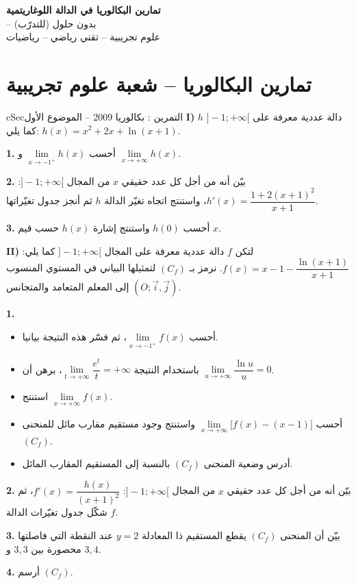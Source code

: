 \documentclass[12pt,a4paper]{article}
\newenvironment{BOX}[2]{\begin{otherlanguage}{english}\begin{arbox}{#1}{#2}}{\end{arbox}\end{otherlanguage}}
\newcounter{exo}
\newenvironment{tamrin}[1]{\stepcounter{exo}\begin{BOX}{cSec}{التمرين \theexo: #1}}{\end{BOX}}
\newenvironment{LTR}{\begin{otherlanguage}{english}}{\end{otherlanguage}}
\newenvironment{sq}{\begin{itemize}[leftmargin=2.4em,itemsep=3pt]}{\end{itemize}}
\newcommand{\qa}{\item[(أ)]}\newcommand{\qb}{\item[(ب)]}\newcommand{\qc}{\item[(جـ)]}\newcommand{\qd}{\item[(د)]}\newcommand{\qe}{\item[(هـ)]}
\newcommand{\QQ}[1]{\par\smallskip\textbf{#1.} }
\begin{document}
\begin{LTR}
\begin{tcolorbox}[enhanced,colback=cSec,colframe=cSec,arc=3mm,halign=center,boxrule=0pt,top=12pt,bottom=12pt,before upper={\selectlanguage{arabic}}]
{\color{white}\fontsize{26}{32}\selectfont\bfseries تمارين البكالوريا في الدالة اللوغاريتمية}\\[8pt]
{\color{white}\large -- بدون حلول (للتدرّب)}\\[5pt]
{\color{white}\large علوم تجريبية -- تقني رياضي -- رياضيات}
\end{tcolorbox}
\end{LTR}

\section{تمارين البكالوريا -- شعبة علوم تجريبية}

\begin{tamrin}{بكالوريا 2009 -- الموضوع الأول}
\textbf{I)} $h$ دالة عددية معرفة على $]-1;+\infty[$ كما يلي: $h(x)=x^2+2x+\ln(x+1)$.
\QQ{1} أحسب $\lim\limits_{x\to -1^{+}}h(x)$ و $\lim\limits_{x\to +\infty}h(x)$.
\QQ{2} بيّن أنه من أجل كل عدد حقيقي $x$ من المجال $]-1;+\infty[$: $h'(x)=\dfrac{1+2(x+1)^2}{x+1}$، واستنتج اتجاه تغيّر الدالة $h$ ثم أنجز جدول تغيّراتها.
\QQ{3} أحسب $h(0)$ واستنتج إشارة $h(x)$ حسب قيم $x$.

\textbf{II)} لتكن $f$ دالة عددية معرفة على المجال $]-1;+\infty[$ كما يلي: $f(x)=x-1-\dfrac{\ln(x+1)}{x+1}$.
نرمز بـ $(C_f)$ لتمثيلها البياني في المستوي المنسوب إلى المعلم المتعامد والمتجانس $(O;\vec i,\vec j)$.
\QQ{1}
\begin{sq}
\qa أحسب $\lim\limits_{x\to -1^{+}}f(x)$، ثم فسّر هذه النتيجة بيانيا.
\qb باستخدام النتيجة $\lim\limits_{t\to +\infty}\dfrac{e^{t}}{t}=+\infty$، برهن أن $\lim\limits_{u\to +\infty}\dfrac{\ln u}{u}=0$.
\qc استنتج $\lim\limits_{x\to +\infty}f(x)$.
\qd أحسب $\lim\limits_{x\to +\infty}\big[f(x)-(x-1)\big]$ واستنتج وجود مستقيم مقارب مائل للمنحنى $(C_f)$.
\qe أدرس وضعية المنحنى $(C_f)$ بالنسبة إلى المستقيم المقارب المائل.
\end{sq}
\QQ{2} بيّن أنه من أجل كل عدد حقيقي $x$ من المجال $]-1;+\infty[$: $f'(x)=\dfrac{h(x)}{(x+1)^2}$، ثم شكّل جدول تغيّرات الدالة $f$.
\QQ{3} بيّن أن المنحنى $(C_f)$ يقطع المستقيم ذا المعادلة $y=2$ عند النقطة التي فاصلتها محصورة بين $3{,}3$ و $3{,}4$.
\QQ{4} أرسم $(C_f)$.
\end{tamrin}
\end{document}
